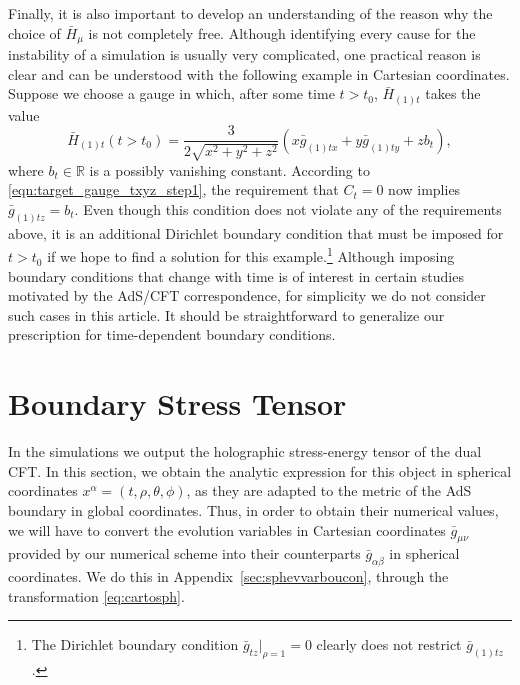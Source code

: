 \documentclass[a4paper,11pt]{article}
\numberwithin{equation}{section}
\begin{document}
Finally, it is also important to develop an understanding of the reason why the choice of $\bar{H}_\mu$ is not completely free. 
Although identifying every cause for the instability of a simulation is usually very complicated, one practical reason is clear and can be understood with the following example in Cartesian coordinates.
Suppose we choose a gauge in which, after some time $t>t_0$, $\bar{H}_{(1)t}$ takes the value
\begin{equation} 
\bar{H}_{(1)t}(t>t_0)=\frac{3}{2\sqrt{x^2+y^2+z^2}}(x \bar{g}_{(1)tx}+y\bar{g}_{(1)ty}+z b_t),
\end{equation} 
where $b_t\in \mathbb{R}$ is a possibly vanishing constant.
According to \eqref{eqn:target_gauge_txyz_step1}, the requirement that $C_t=0$ now implies $\bar{g}_{(1)tz}=b_t$. 
Even though this condition does not violate any of the requirements above, it is an additional Dirichlet boundary condition that must be imposed for $t>t_0$ if we hope to find a solution for this example.\footnote{The Dirichlet boundary condition $\bar{g}_{tz}|_{\rho=1}=0$ clearly does not restrict $\bar{g}_{(1)tz}$.} Although imposing boundary conditions that change with time is of interest in certain studies motivated by the AdS/CFT correspondence, for simplicity we do not consider such cases in this article. It should be straightforward to generalize our prescription for time-dependent boundary conditions. 



\section{Boundary Stress Tensor}
\label{sec:bouset2}

In the simulations we output the holographic stress-energy tensor of the dual CFT.
In this section, we obtain the analytic expression for this object in spherical coordinates $x^\alpha=(t,\rho,\theta,\phi)$, as they are adapted to the metric of the AdS boundary in global coordinates. Thus, in order to obtain their numerical values, we will have to convert the evolution variables in Cartesian coordinates $\bar{g}_{\mu\nu}$ provided by our numerical scheme into their counterparts $\bar{g}_{\alpha\beta}$ in spherical coordinates. We do this in Appendix~\ref{sec:sphevvarboucon}, through the transformation \eqref{eq:cartosph}.
\end{document}
